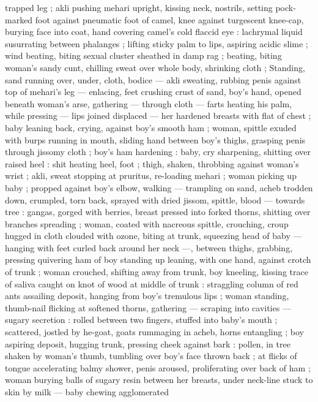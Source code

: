trapped leg ; akli pushing mehari upright, kissing neck, nostrils, 
setting pock-marked foot against pneumatic foot of camel, knee 
against turgescent knee-cap, burying face into coat, hand covering 
camel's cold flaccid eye : lachrymal liquid susurrating between 
phalanges ; lifting sticky palm to lips, aspiring acidic slime ; wind 
beating, biting sexual cluster sheathed in damp rag ; beating, biting 
woman's sandy cunt, chilling sweat over whole body, shrinking cloth 
; Standing, sand running over, under, cloth, bodice --- akli sweating, 
rubbing penis against top of mehari's leg --- enlacing, feet crushing 
crust of sand, boy's hand, opened beneath woman's arse, gathering 
--- through cloth --- farts heating his palm, while pressing --- lips 
joined displaced --- her hardened breasts with flat of chest ; baby 
leaning back, crying, against boy's smooth ham ; woman, spittle 
exuded with burps running in mouth, sliding hand between boy's 
thighs, grasping penis through jissomy cloth ; boy's ham hardening 
: baby, cry sharpening, shitting over raised heel : shit heating heel, 
foot ; thigh, shaken, throbbing against woman's wrist ; akli, sweat 
stopping at pruritus, re-loading mehari ; woman picking up baby ; 
propped against boy's elbow, walking --- trampling on sand, acheb 
trodden down, crumpled, torn back, sprayed with dried jissom, 
spittle, blood --- towards tree : gangas, gorged with berries, breast 
pressed into forked thorns, shitting over branches spreading ; 
woman, coated with nacreous spittle, crouching, croup hugged in 
cloth clouded with ozone, biting at trunk, squeezing head of baby --- 
hanging with feet curled back around her neck ---, between thighs, 
grabbing, pressing quivering ham of boy standing up leaning, with 
one hand, against crotch of trunk ; woman crouched, shifting away 
from trunk, boy kneeling, kissing trace of saliva caught on knot of 
wood at middle of trunk : straggling column of red ants assailing 
deposit, hanging from boy's tremulous lips ; woman standing, 
thumb-nail flicking at softened thorns, gathering --- scraping into 
cavities --- sugary secretion : rolled between two fingers, stuffed into 
baby's mouth ; scattered, jostled by he-goat, goats rummaging in 
acheb, horns entangling ; boy aspiring deposit, hugging trunk, 
pressing cheek against bark : pollen, in tree shaken by woman's 
thumb, tumbling over boy's face thrown back ; at flicks of tongue 
accelerating balmy shower, penis aroused, proliferating over back of 
ham ; woman burying balls of sugary resin between her breasts, 
under neck-line stuck to skin by milk --- baby chewing agglomerated 
